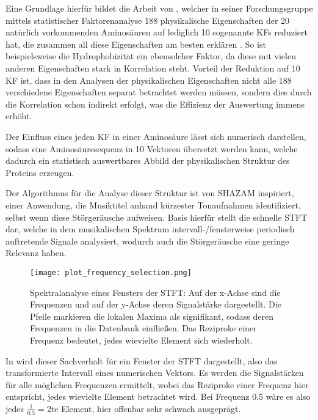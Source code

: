     Eine Grundlage hierfür bildet die Arbeit von \citeauthor{kidera}, welcher in seiner Forschungsgruppe mittels statistischer Faktorenanalyse 188 physikalische Eigenschaften der 20 natürlich vorkommenden Aminosäuren auf lediglich 10 sogenannte \acp{KF} reduziert hat, die zusammen all diese Eigenschaften am besten erklären . So ist beispielsweise die Hydrophobizität ein ebensolcher Faktor, da diese mit vielen anderen Eigenschaften stark in Korrelation steht. Vorteil der Reduktion auf 10 \ac{KF} ist, dass in den Analysen der physikalischen Eigenschaften nicht alle 188 verschiedene Eigenschaften separat betrachtet werden müssen, sondern dies durch die Korrelation schon indirekt erfolgt, was die Effizienz der Auswertung immens erhöht.

    Der Einfluss eines jeden \ac{KF} in einer Aminosäure lässt sich numerisch darstellen, sodass eine Aminosäuresequenz in 10 Vektoren übersetzt werden kann, welche dadurch ein statistisch auswertbares Abbild der physikalischen Struktur des Proteins erzeugen.

    Der Algorithmus für die Analyse dieser Struktur ist von SHAZAM inspiriert, einer Anwendung, die Musiktitel anhand kürzester Tonaufnahmen identifiziert, selbst wenn diese Störgeräusche aufweisen. Basis hierfür stellt die schnelle \ac{STFT} dar, welche in dem musikalischen Spektrum intervall-/fensterweise periodisch auftretende Signale analysiert, wodurch auch die Störgeräusche eine geringe Relevanz haben.

    \begin{figure}[H]
        \texttt{[image: plot\_frequency\_selection.png]}
        \caption[Spektralanalyse eines Intervalls/Fensters der STFT mit Markierung lokaler Maxima]{Spektralanalyse eines Fensters der STFT\@: Auf der x-Achse sind die Frequenzen und auf der y-Achse deren Signalstärke dargestellt. Die Pfeile markieren die lokalen Maxima als signifikant, sodass deren Frequenzen in die Datenbank einfließen. Das Reziproke einer Frequenz bedeutet, jedes wievielte Element sich wiederholt.}
        \label{fig:freq_selection}
    \end{figure}

    In  wird dieser Sachverhalt für ein Fenster der \ac{STFT} dargestellt, also das transformierte Intervall eines numerischen Vektors. Es werden die Signalstärken für alle möglichen Frequenzen ermittelt, wobei das Reziproke einer Frequenz hier entspricht, jedes wievielte Element betrachtet wird. Bei Frequenz 0.5 wäre es also jedes $\frac{1}{0.5} = 2$te Element, hier offenbar sehr schwach ausgeprägt.

